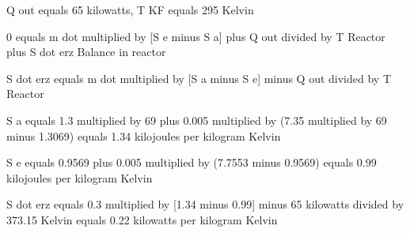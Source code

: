 Q out equals 65 kilowatts, T KF equals 295 Kelvin  

0 equals m dot multiplied by [S e minus S a] plus Q out divided by T Reactor plus S dot erz  
Balance in reactor  

S dot erz equals m dot multiplied by [S a minus S e] minus Q out divided by T Reactor  

S a equals 1.3 multiplied by 69 plus 0.005 multiplied by (7.35 multiplied by 69 minus 1.3069) equals 1.34 kilojoules per kilogram Kelvin  

S e equals 0.9569 plus 0.005 multiplied by (7.7553 minus 0.9569) equals 0.99 kilojoules per kilogram Kelvin  

S dot erz equals 0.3 multiplied by [1.34 minus 0.99] minus 65 kilowatts divided by 373.15 Kelvin equals 0.22 kilowatts per kilogram Kelvin